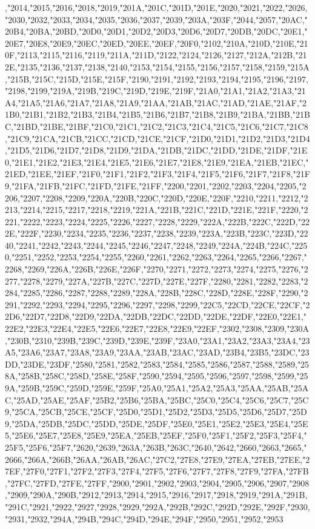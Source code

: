 ,"2014,"2015,"2016,"2018,"2019,"201A,"201C,"201D,"201E,"2020,"2021,"2022,"2026,"2030,"2032,"2033,"2034,"2035,"2036,"2037,"2039,"203A,"203F,"2044,"2057,"20AC,"20B4,"20BA,"20BD,"20D0,"20D1,"20D2,"20D3,"20D6,"20D7,"20DB,"20DC,"20E1,"20E7,"20E8,"20E9,"20EC,"20ED,"20EE,"20EF,"20F0,"2102,"210A,"210D,"210E,"210F,"2113,"2115,"2116,"2119,"211A,"211D,"2122,"2124,"2126,"2127,"212A,"212B,"212E,"2135,"2136,"2137,"2138,"2140,"2153,"2154,"2155,"2156,"2157,"2158,"2159,"215A,"215B,"215C,"215D,"215E,"215F,"2190,"2191,"2192,"2193,"2194,"2195,"2196,"2197,"2198,"2199,"219A,"219B,"219C,"219D,"219E,"219F,"21A0,"21A1,"21A2,"21A3,"21A4,"21A5,"21A6,"21A7,"21A8,"21A9,"21AA,"21AB,"21AC,"21AD,"21AE,"21AF,"21B0,"21B1,"21B2,"21B3,"21B4,"21B5,"21B6,"21B7,"21B8,"21B9,"21BA,"21BB,"21BC,"21BD,"21BE,"21BF,"21C0,"21C1,"21C2,"21C3,"21C4,"21C5,"21C6,"21C7,"21C8,"21C9,"21CA,"21CB,"21CC,"21CD,"21CE,"21CF,"21D0,"21D1,"21D2,"21D3,"21D4,"21D5,"21D6,"21D7,"21D8,"21D9,"21DA,"21DB,"21DC,"21DD,"21DE,"21DF,"21E0,"21E1,"21E2,"21E3,"21E4,"21E5,"21E6,"21E7,"21E8,"21E9,"21EA,"21EB,"21EC,"21ED,"21EE,"21EF,"21F0,"21F1,"21F2,"21F3,"21F4,"21F5,"21F6,"21F7,"21F8,"21F9,"21FA,"21FB,"21FC,"21FD,"21FE,"21FF,"2200,"2201,"2202,"2203,"2204,"2205,"2206,"2207,"2208,"2209,"220A,"220B,"220C,"220D,"220E,"220F,"2210,"2211,"2212,"2213,"2214,"2215,"2217,"2218,"2219,"221A,"221B,"221C,"221D,"221E,"221F,"2220,"2221,"2222,"2223,"2224,"2225,"2226,"2227,"2228,"2229,"222A,"222B,"222C,"222D,"222E,"222F,"2230,"2234,"2235,"2236,"2237,"2238,"2239,"223A,"223B,"223C,"223D,"2240,"2241,"2242,"2243,"2244,"2245,"2246,"2247,"2248,"2249,"224A,"224B,"224C,"2250,"2251,"2252,"2253,"2254,"2255,"2260,"2261,"2262,"2263,"2264,"2265,"2266,"2267,"2268,"2269,"226A,"226B,"226E,"226F,"2270,"2271,"2272,"2273,"2274,"2275,"2276,"2277,"2278,"2279,"227A,"227B,"227C,"227D,"227E,"227F,"2280,"2281,"2282,"2283,"2284,"2285,"2286,"2287,"2288,"2289,"228A,"228B,"228C,"228D,"228E,"228F,"2290,"2291,"2292,"2293,"2294,"2295,"2296,"2297,"2298,"2299,"22C5,"22CD,"22CE,"22CF,"22D6,"22D7,"22D8,"22D9,"22DA,"22DB,"22DC,"22DD,"22DE,"22DF,"22E0,"22E1,"22E2,"22E3,"22E4,"22E5,"22E6,"22E7,"22E8,"22E9,"22EF,"2302,"2308,"2309,"230A,"230B,"2310,"239B,"239C,"239D,"239E,"239F,"23A0,"23A1,"23A2,"23A3,"23A4,"23A5,"23A6,"23A7,"23A8,"23A9,"23AA,"23AB,"23AC,"23AD,"23B4,"23B5,"23DC,"23DD,"23DE,"23DF,"2580,"2581,"2582,"2583,"2584,"2585,"2586,"2587,"2588,"2589,"258A,"258B,"258C,"258D,"258E,"258F,"2590,"2594,"2595,"2596,"2597,"2598,"2599,"259A,"259B,"259C,"259D,"259E,"259F,"25A0,"25A1,"25A2,"25A3,"25AA,"25AB,"25AC,"25AD,"25AE,"25AF,"25B2,"25B6,"25BA,"25BC,"25C0,"25C4,"25C6,"25C7,"25C9,"25CA,"25CB,"25CE,"25CF,"25D0,"25D1,"25D2,"25D3,"25D5,"25D6,"25D7,"25D9,"25DA,"25DB,"25DC,"25DD,"25DE,"25DF,"25E0,"25E1,"25E2,"25E3,"25E4,"25E5,"25E6,"25E7,"25E8,"25E9,"25EA,"25EB,"25EF,"25F0,"25F1,"25F2,"25F3,"25F4,"25F5,"25F6,"25F7,"2620,"2639,"263A,"263B,"263C,"2640,"2642,"2660,"2663,"2665,"2666,"266A,"266B,"26AA,"26AB,"26AC,"27C2,"27E8,"27E9,"27EA,"27EB,"27EE,"27EF,"27F0,"27F1,"27F2,"27F3,"27F4,"27F5,"27F6,"27F7,"27F8,"27F9,"27FA,"27FB,"27FC,"27FD,"27FE,"27FF,"2900,"2901,"2902,"2903,"2904,"2905,"2906,"2907,"2908,"2909,"290A,"290B,"2912,"2913,"2914,"2915,"2916,"2917,"2918,"2919,"291A,"291B,"291C,"2921,"2922,"2927,"2928,"2929,"292A,"292B,"292C,"292D,"292E,"292F,"2930,"2931,"2932,"294A,"294B,"294C,"294D,"294E,"294F,"2950,"2951,"2952,"2953